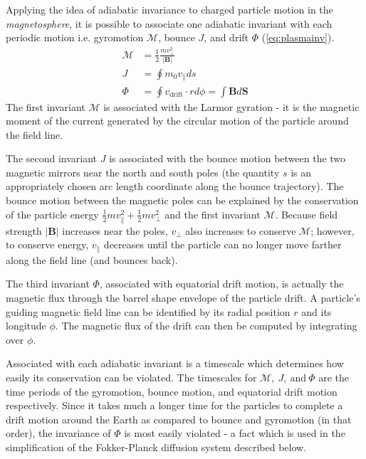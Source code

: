 Applying the idea of adiabatic invariance to charged particle motion in the \emph{magnetosphere}, 
it is possible to associate one adiabatic invariant with each periodic motion i.e. gyromotion 
$\mathcal{M}$, bounce $J$, and drift $\Phi$ (\cref{eq:plasmainv}). 
%
\begin{align}\label{eq:plasmainv}
    \mathcal{M} &= \frac{1}{2}\frac{mv^{2}_{\perp}}{\rvert \mathbf{B} \rvert} \\
    J &= \oint{m_0 v_{\parallel}ds} \\
    \Phi &= \oint{v_{\text{drift}} \cdot r d\phi} = \int{\mathbf{B} d\mathbf{S}}
\end{align}
%
The first invariant $\mathcal{M}$ is associated with the Larmor gyration - it is the magnetic 
moment of the current generated by the circular motion of the particle around the field line. 

The second invariant $J$ is associated with the bounce motion between the two magnetic mirrors near 
the north and south poles (the quantity $s$ is an appropriately chosen arc length coordinate along 
the bounce trajectory). The bounce motion between the magnetic poles can be explained by the 
conservation of the particle energy $\frac{1}{2}m v^2_{\parallel} + \frac{1}{2}m v^{2}_{\perp}$ and 
the first invariant $\mathcal{M}$. Because field strength $\rvert \mathbf{B} \rvert$ increases 
near the poles, $v_{\perp}$ also increases to conserve $\mathcal{M}$; however, to conserve energy, 
$v_{\parallel}$ decreases until the particle can no longer move farther along the field line (and 
bounces back).

The third invariant $\Phi$, associated with equatorial drift motion, is actually the magnetic 
flux through the barrel shape envelope of the particle drift. A particle's guiding magnetic field 
line can be identified by its radial position $r$ and its longitude $\phi$. The magnetic flux of 
the drift can then be computed by integrating over $\phi$.

Associated with each adiabatic invariant is a timescale which determines how easily its 
conservation can be violated. The timescales for $\mathcal{M},\ J, \ \text{and} \ \Phi$ are the 
time periods of the gyromotion, bounce motion, and equatorial drift motion respectively. Since 
it takes much a longer time for the particles to complete a drift motion around the Earth as 
compared to bounce and gyromotion (in that order), the invariance of $\Phi$ is most easily 
violated - a fact which is used in the simplification of the Fokker-Planck diffusion system 
described below.    

